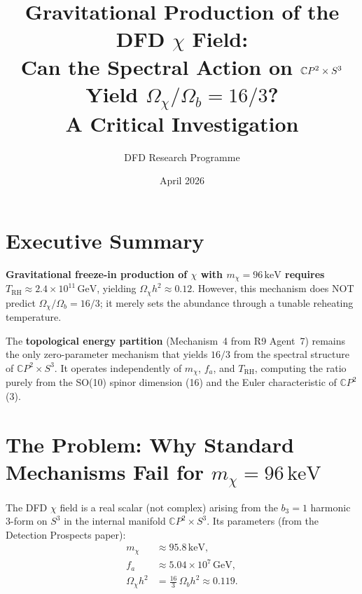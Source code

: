 \documentclass[11pt]{article}
\title{Gravitational Production of the DFD $\chi$ Field:\\
Can the Spectral Action on $\CP^2 \times S^3$ Yield
$\Omega_\chi/\Omega_b = 16/3$?\\[6pt]
\large A Critical Investigation}
\author{DFD Research Programme}
\date{April 2026}
\theoremstyle{definition}
\theoremstyle{remark}
\newcommand{\CP}{\mathbb{C}P}
\newcommand{\keV}{\,\mathrm{keV}}
\newcommand{\GeV}{\,\mathrm{GeV}}
\begin{document}
\maketitle

\section{Executive Summary}

\begin{tcolorbox}[colback=blue!5!white, colframe=blue!70!black,
  title=\textbf{Central Finding}]
\textbf{Gravitational freeze-in production of $\chi$ with $m_\chi = 96\keV$
requires $T_\mathrm{RH} \approx 2.4 \times 10^{11}\GeV$}, yielding
$\Omega_\chi h^2 \approx 0.12$. However, this mechanism does NOT predict
$\Omega_\chi/\Omega_b = 16/3$; it merely sets the abundance through a
tunable reheating temperature.

\medskip

The \textbf{topological energy partition} (Mechanism~4 from R9 Agent~7)
remains the only zero-parameter mechanism that yields $16/3$ from the
spectral structure of $\CP^2 \times S^3$. It operates independently of
$m_\chi$, $f_a$, and $T_\mathrm{RH}$, computing the ratio purely from
the SO(10) spinor dimension (16) and the Euler characteristic of $\CP^2$ (3).
\end{tcolorbox}


\section{The Problem: Why Standard Mechanisms Fail for $m_\chi = 96\keV$}
\label{sec:problem}

The DFD $\chi$ field is a real scalar (not complex) arising from the
$b_3 = 1$ harmonic 3-form on $S^3$ in the internal manifold
$\CP^2 \times S^3$. Its parameters (from the Detection Prospects paper):
\begin{align}
  m_\chi &\approx 95.8\keV, \\
  f_a &\approx 5.04 \times 10^7\GeV, \\
  \Omega_\chi h^2 &= \tfrac{16}{3}\,\Omega_b h^2 \approx 0.119.
\end{align}
\end{document}
